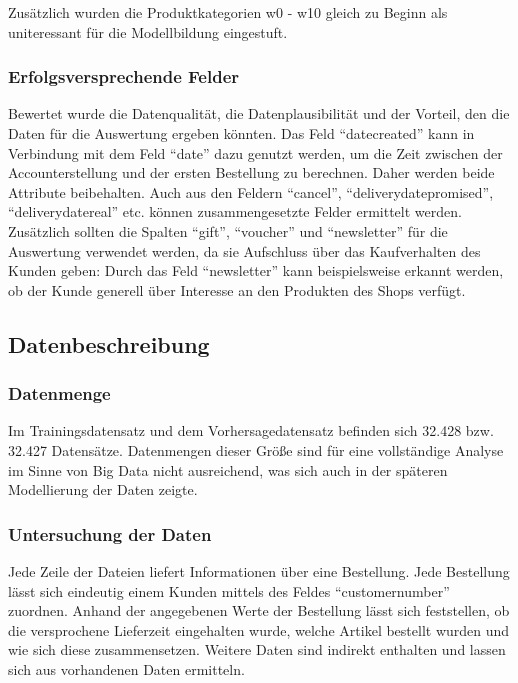 \documentclass[a4paper,12pt]{article}
\begin{document}
Zusätzlich wurden die Produktkategorien w0 - w10 gleich zu Beginn als uniteressant für die Modellbildung eingestuft.


\subsubsection{Erfolgsversprechende Felder}
Bewertet wurde die Datenqualität, die Datenplausibilität und der
Vorteil, den die Daten für die Auswertung ergeben könnten. Das Feld "`datecreated"' kann in Verbindung
mit dem Feld "`date"' dazu genutzt werden, um die Zeit zwischen der Accounterstellung
und der ersten Bestellung zu berechnen. Daher werden beide Attribute beibehalten. Auch aus
den Feldern "`cancel"', "`deliverydatepromised"', "`deliverydatereal"'
etc. können zusammengesetzte Felder ermittelt werden.
Zusätzlich sollten die Spalten "`gift"', "`voucher"' und "`newsletter"' für die Auswertung verwendet werden, da sie Aufschluss über das Kaufverhalten des Kunden geben: Durch das Feld
"`newsletter"' kann beispielsweise erkannt werden, ob der Kunde generell über Interesse an den Produkten
des Shops verfügt. 

\subsection{Datenbeschreibung}

\subsubsection{Datenmenge}
Im Trainingsdatensatz und dem Vorhersagedatensatz befinden sich 32.428 bzw. 32.427 Datensätze.
Datenmengen dieser Größe sind für eine vollständige Analyse im Sinne von Big Data nicht
ausreichend, was sich auch in der späteren Modellierung der Daten zeigte.

\subsubsection{Untersuchung der Daten}

Jede Zeile der Dateien liefert Informationen über eine Bestellung. Jede Bestellung lässt sich eindeutig einem Kunden mittels des
Feldes "`customernumber"' zuordnen. Anhand der angegebenen Werte der Bestellung lässt sich
feststellen, ob die versprochene Lieferzeit eingehalten wurde, welche Artikel bestellt wurden
und wie sich diese zusammensetzen. Weitere Daten sind indirekt enthalten und lassen sich aus vorhandenen Daten ermitteln.
\end{document}
